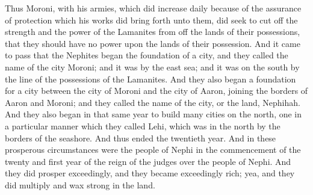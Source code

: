 \bverse \iffalse Thus Moroni, with his armies, which did increase daily because of the assurance of protection which his works did bring forth unto them, did seek to cut off the strength and the power of the Lamanites from off the lands of their possessions, that they should have no power upon the lands of their possession. \fi
Thus Moroni, with his armies, which did increase daily because of the assurance of protection which his works did bring forth unto them, did seek to cut off the strength and the power of the Lamanites from off the lands of their possessions, that they should have no power upon the lands of their possession.
\bverse \iffalse And it came to pass that the Nephites began the foundation of a city, and they called the name of the city Moroni; and it was by the east sea; and it was on the south by the line of the possessions of the Lamanites. \fi
And it came to pass that the Nephites began the foundation of a city, and they called the name of the city Moroni; and it was by the east sea; and it was on the south by the line of the possessions of the Lamanites.
\bverse \iffalse And they also began a foundation for a city between the city of Moroni and the city of Aaron, joining the borders of Aaron and Moroni; and they called the name of the city, or the land, Nephihah. \fi
And they also began a foundation for a city between the city of Moroni and the city of Aaron, joining the borders of Aaron and Moroni; and they called the name of the city, or the land, Nephihah.
\bverse \iffalse And they also began in that same year to build many cities on the north, one in a particular manner which they called Lehi, which was in the north by the borders of the seashore. \fi
And they also began in that same year to build many cities on the north, one in a particular manner which they called Lehi, which was in the north by the borders of the seashore.
\bverse \iffalse And thus ended the twentieth year. \fi
And thus ended the twentieth year.
\bverse \iffalse And in these prosperous circumstances were the people of Nephi in the commencement of the twenty and first year of the reign of the judges over the people of Nephi. \fi
And in these prosperous circumstances were the people of Nephi in the commencement of the twenty and first year of the reign of the judges over the people of Nephi.
\bverse \iffalse And they did prosper exceedingly, and they became exceedingly rich; yea, and they did multiply and wax strong in the land. \fi
And they did prosper exceedingly, and they became exceedingly rich; yea, and they did multiply and wax strong in the land.

